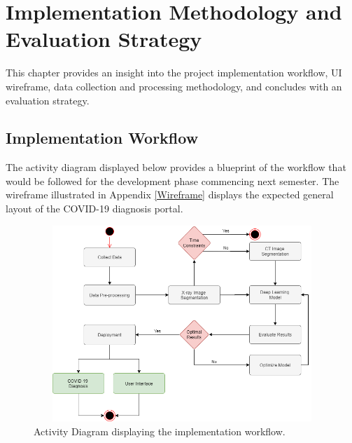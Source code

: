 
\chapter{Implementation Methodology and Evaluation Strategy} %

\label{ChapterX} %


This chapter provides an insight into the project implementation 
workflow, UI wireframe, data collection and processing methodology, 
and concludes with an evaluation strategy.

\section{Implementation Workflow}
The activity diagram displayed below provides a blueprint of the workflow 
that would be followed for the development phase commencing next semester. The wireframe illustrated in Appendix \ref{Wireframe} displays the expected general layout of the COVID-19 diagnosis portal.

\begin{figure}[H]
 \centering
 \includegraphics[width=15.5cm, height=7.4cm]{Images/Implementation Workflow.png}
 \decoRule
 \caption[Implementation Methodology]{Activity Diagram displaying the implementation workflow.}
 \label{fig:Implementation Methodology}
 \end{figure}
 
